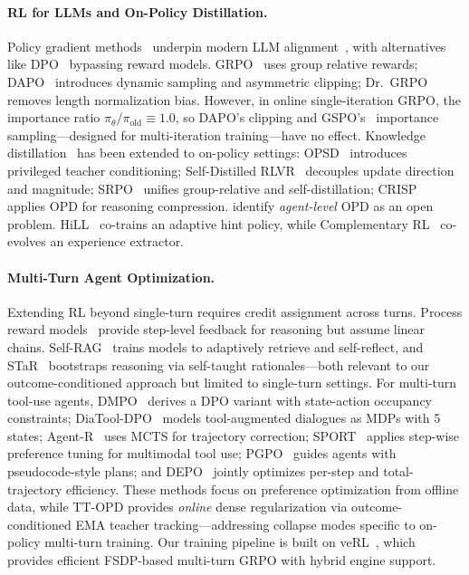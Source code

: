 \documentclass{article}
\begin{document}
\paragraph{RL for LLMs and On-Policy Distillation.}
Policy gradient methods~\citep{schulman2017ppo} underpin modern LLM alignment~\citep{ouyang2022instructgpt}, with alternatives like DPO~\citep{rafailov2023dpo} bypassing reward models. GRPO~\citep{shao2024deepseekmath} uses group relative rewards; DAPO~\citep{dapo2025} introduces dynamic sampling and asymmetric clipping; Dr.~GRPO~\citep{liu2025drgrpo} removes length normalization bias. However, in online single-iteration GRPO, the importance ratio $\pi_\theta/\pi_\text{old} \equiv 1.0$, so DAPO's clipping and GSPO's~\citep{gspo2025} importance sampling---designed for multi-iteration training---have no effect. Knowledge distillation~\citep{hinton2015distillation} has been extended to on-policy settings: OPSD~\citep{zhao26opsd} introduces privileged teacher conditioning; Self-Distilled RLVR~\citep{yang26rlsd} decouples update direction and magnitude; SRPO~\citep{li26srpo} unifies group-relative and self-distillation; CRISP~\citep{sang26crisp} applies OPD for reasoning compression. \citet{song26opdsurvey} identify \emph{agent-level} OPD as an open problem. HiLL~\citep{xia26hill} co-trains an adaptive hint policy, while Complementary RL~\citep{muhtar26complementaryrl} co-evolves an experience extractor.

\paragraph{Multi-Turn Agent Optimization.}
Extending RL beyond single-turn requires credit assignment across turns. Process reward models~\citep{lightman2024lets, uesato2022solving} provide step-level feedback for reasoning but assume linear chains. Self-RAG~\citep{asai2023selfrag} trains models to adaptively retrieve and self-reflect, and STaR~\citep{zelikman2022star} bootstraps reasoning via self-taught rationales---both relevant to our outcome-conditioned approach but limited to single-turn settings. For multi-turn tool-use agents, DMPO~\citep{shi2024dmpo} derives a DPO variant with state-action occupancy constraints; DiaTool-DPO~\citep{jung2025diatooldpo} models tool-augmented dialogues as MDPs with 5 states; Agent-R~\citep{yuan2025agentr} uses MCTS for trajectory correction; SPORT~\citep{li2025sport} applies step-wise preference tuning for multimodal tool use; PGPO~\citep{cao2025pgpo} guides agents with pseudocode-style plans; and DEPO~\citep{chen2025depo} jointly optimizes per-step and total-trajectory efficiency. These methods focus on preference optimization from offline data, while TT-OPD provides \emph{online} dense regularization via outcome-conditioned EMA teacher tracking---addressing collapse modes specific to on-policy multi-turn training. Our training pipeline is built on veRL~\citep{sheng2024verl}, which provides efficient FSDP-based multi-turn GRPO with hybrid engine support.
\end{document}
